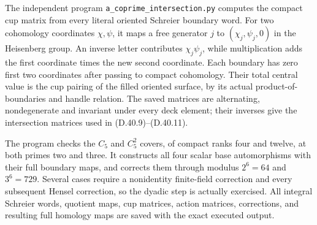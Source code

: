 The independent program
\texttt{a\_coprime\_intersection.py}
computes the compact cup matrix from every
literal oriented Schreier boundary word.
For two cohomology coordinates \(\chi,\psi\),
it maps a free generator \(j\) to
\((\chi_j,\psi_j,0)\) in the Heisenberg group.
An inverse letter contributes
\(\chi_j\psi_j\), while multiplication adds
the first coordinate times the new second
coordinate.  Each boundary has zero first
two coordinates after passing to compact
cohomology.  Their total central value is
the cup pairing of the filled oriented
surface, by its actual product-of-boundaries
and handle relation.
The saved matrices are alternating,
nondegenerate and invariant under every deck
element; their inverses give the intersection
matrices used in \textup{(D.40.9)--(D.40.11)}.

The program checks the \(C_5\) and \(C_5^2\)
covers, of compact ranks four and twelve,
at both primes two and three.
It constructs all four scalar base
automorphisms with their full boundary maps,
and corrects them through modulus \(2^6=64\)
and \(3^6=729\).
Several cases require a nonidentity
finite-field correction and every subsequent
Hensel correction, so the dyadic step is
actually exercised.
All integral Schreier words, quotient maps,
cup matrices, action matrices, corrections,
and resulting full homology maps are saved
with the exact executed output.
